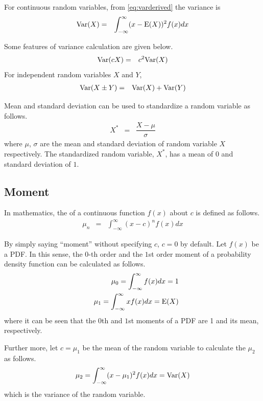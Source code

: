 For continuous random variables, from \eqref{eq:varderived} the variance is
\begin{eqnarray}
	\textup{Var}(X) &=& \int_{-\infty}^{\infty} (x-\textup{E}(X))^2f(x)dx \nonumber
\end{eqnarray}

Some features of variance calculation are given below.
\begin{eqnarray}
	\textup{Var}(cX) &=& c^2\textup{Var}(X) \nonumber
\end{eqnarray}
For independent random variables $X$ and $Y$,
\begin{eqnarray}
	\textup{Var}(X\pm Y) &=& \textup{Var}(X) + \textup{Var}(Y) \nonumber
\end{eqnarray}

Mean and standard deviation can be used to standardize a random variable as follows.
\begin{eqnarray}
	X^* &=& \dfrac{X-\mu}{\sigma} \nonumber
\end{eqnarray}
where $\mu$, $\sigma$ are the mean and standard deviation of random variable $X$ respectively. The standardized random variable, $X^*$, has a mean of $0$ and standard deviation of $1$.

\subsection{Moment} \label{sec:moments}

In mathematics, the  of a continuous function $f(x)$ about $c$ is defined as follows.
\begin{eqnarray}
	\mu_n &=& \int_{-\infty}^{\infty}(x-c)^nf(x)dx \nonumber
\end{eqnarray}

By simply saying ``moment'' without specifying $c$, $c=0$ by default. Let $f(x)$ be a PDF. In this sense, the $0$-th order and the $1$st order moment of a probability density function can be calculated as follows.
\begin{eqnarray}
	&& \mu_0 = \int_{-\infty}^{\infty}f(x)dx = 1 \nonumber \\
	&& \mu_1 = \int_{-\infty}^{\infty}xf(x)dx = \textup{E}(X) \nonumber
\end{eqnarray}
where it can be seen that the $0$th and $1$st moments of a PDF are 1 and its mean, respectively.

Further more, let $c=\mu_1$ be the mean of the random variable to calculate the  $\mu_2$ as follows.
\begin{eqnarray}
	\mu_2 = \int_{-\infty}^{\infty}(x-\mu_1)^2f(x)dx = \textup{Var}(X) \nonumber
\end{eqnarray}
which is the variance of the random variable.

